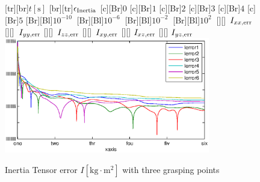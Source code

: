 \begin{figure}
	\centering	
	[tr][br]{$t\left[\mathrm{s}\right]$}
	[br][tr]{$\epsilon_{\mathrm{Inertia}}$}
	[Br]{$0$}
	[Br]{$1$}
	[Br]{$2$}
	[Br]{$3$}
	[Br]{$4$}
	[Br]{$5$}
	[Br][Bl]{$10^{-10}\  $}
	[Br][Bl]{$10^{-6}\  $}
	[Br][Bl]{$10^{-2}\  $}
	[Br][Bl]{$10^2\  $}
	[][]{\tiny \  $I_{xx,\mathrm{err}}$}
	[][]{\tiny \  $I_{yy,\mathrm{err}}$}
	[][]{\tiny \  $I_{zz,\mathrm{err}}$}
	[][]{\tiny \  $I_{xy,\mathrm{err}}$}
	[][]{\tiny \hspace{0.5cm} $I_{xz,\mathrm{err}}$}
	[][]{\tiny \hspace{0.5cm} $I_{yz,\mathrm{err}}$}
	\includegraphics[width=0.8\textwidth]{figures/inertia_multi.eps}
	\vspace{0.2cm}
	\caption[Inertia Tensor error, three grasping points]{Inertia Tensor error $I \left[\mathrm{kg} \cdot \mathrm{m}^2\right]$ with three grasping points}
	\label{fig:estim_inertia_multi}
\end{figure}

